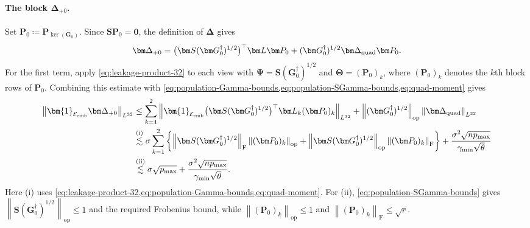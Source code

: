\documentclass[11pt]{article}
\newcommand{\ind}{\bm{1}}
\newcommand{\trans}{\top}
\newcommand{\opn}[1]{\left\lVert #1\right\rVert_{\mathrm{op}}}
\newcommand{\frn}[1]{\left\lVert #1\right\rVert_{\mathrm{F}}}
\newcommand{\Lqn}[2]{\left\lVert #1\right\rVert_{L^{#2}}}
\newcommand{\cE}{\mathcal{E}}
\newcommand{\bze}{\bm{0}}
\newcommand{\gmin}{\gamma_{\min}}
\begin{document}
\paragraph{The block $\bm\Delta_{+0}$.}
Set $\bm P_0\coloneqq\bm P_{\ker(\bm G_0)}$. Since
$\bm S\bm P_0=\bze$, the definition of $\bm\Delta$ gives
\[
  \bm\Delta_{+0}
  =
  \bigl(\bm S(\bm G_0^\dagger)^{1/2}\bigr)^\trans
  \bm L\bm P_0
  +
  (\bm G_0^\dagger)^{1/2}
  \bm\Delta_{\rm quad}\bm P_0.
\]
For the first term, apply \cref{eq:leakage-product-32} to each view with
$\bm\Psi=\bm S(\bm G_0^\dagger)^{1/2}$ and
$\bm\Theta=(\bm P_0)_k$, where $(\bm P_0)_k$ denotes the $k$th block
rows of $\bm P_0$. Combining this estimate with
\cref{eq:population-Gamma-bounds,eq:population-SGamma-bounds,eq:quad-moment}
gives
\begin{align}
  \Lqn{
    \ind_{\cE_{\rm emb}}\bm\Delta_{+0}
  }{32}
  &\le
  \sum_{k=1}^2
  \Lqn{
    \ind_{\cE_{\rm emb}}
    \bigl(\bm S(\bm G_0^\dagger)^{1/2}\bigr)^\trans
    \bm L_k(\bm P_0)_k
  }{32}
  +
  \opn{(\bm G_0^\dagger)^{1/2}}
  \Lqn{\bm\Delta_{\rm quad}}{32} \nonumber \\
  &\overset{\mathrm{(i)}}{\lesssim}
  \sigma\sum_{k=1}^2
  \left\{
    \frn{\bm S(\bm G_0^\dagger)^{1/2}}\opn{(\bm P_0)_k}
    +
    \opn{\bm S(\bm G_0^\dagger)^{1/2}}\frn{(\bm P_0)_k}
  \right\}
  +
  \frac{\sigma^2\sqrt{np_{\max}}}{\gmin\sqrt\theta} \nonumber \\
  &\overset{\mathrm{(ii)}}{\lesssim}
  \sigma\sqrt{p_{\max}}
  +
  \frac{\sigma^2\sqrt{np_{\max}}}{\gmin\sqrt\theta}.\label{eq:relative-p0}
\end{align}
Here (i) uses
\cref{eq:leakage-product-32,eq:population-Gamma-bounds,eq:quad-moment}.
For (ii), \cref{eq:population-SGamma-bounds} gives
$\opn{\bm S(\bm G_0^\dagger)^{1/2}}\le1$ and the required Frobenius bound,
while $\opn{(\bm P_0)_k}\le1$ and
$\frn{(\bm P_0)_k}\le\sqrt r$.
\end{document}
